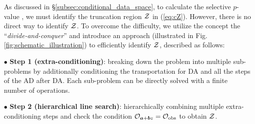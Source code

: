 As discussed in \S \ref{subsec:conditional_data_space}, to calculate the selective $p$-value , we must identify the truncation region ${\mathcal Z}$ in (\ref{eq:cZ}).
%
%
However, there is no direct way to identify ${\mathcal Z}$.
%
To overcome the difficulty, we utilize the concept the ``\emph{divide-and-conquer}'' and introduce an approach (illustrated in Fig. \ref{fig:schematic_illustration}) to efficiently identify ${\mathcal Z}$, described as follows:

$\bullet$ \textbf{Step 1 (extra-conditioning)}: breaking down the problem into multiple sub-problems by additionally conditioning the transportation for DA and all the steps of the AD after DA. Each sub-problem can be directly solved with a finite number of operations.

$\bullet$ \textbf{Step 2 (hierarchical line search)}: hierarchically combining multiple extra-conditioning steps and check the condition ${\mathcal O}_{\bm a + \bm b z} = {\mathcal O}_{\rm obs}$ to obtain ${\mathcal Z}$.

